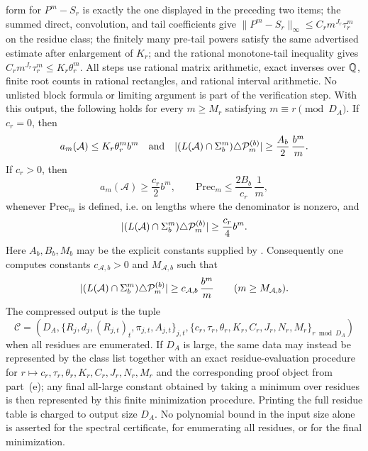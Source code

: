 \begin{theorem}
  form for \(P^m-S_r\) is exactly the one displayed in the preceding
  two items; the summed direct, convolution, and tail coefficients give
  \(\|P^m-S_r\|_\infty\le C_rm^{J_r}\tau_r^m\) on the residue class;
  the finitely many pre-tail powers satisfy the same advertised
  estimate after enlargement of \(K_r\); and the rational monotone-tail
  inequality gives \(C_rm^{J_r}\tau_r^m\le K_r\theta_r^m\). All steps
  use rational matrix arithmetic, exact inverses over \(\mathbb{Q}\), finite
  root counts in rational rectangles, and rational interval arithmetic.
  No unlisted block formula or limiting argument is part of the
  verification step.
  With this output, the following holds for every
  \(m\ge M_r\) satisfying \(m\equiv r\pmod {D_A}\).
  If \(c_r=0\), then
  \[
    a_m(\mathcal A)\le K_r\theta_r^m b^m
    \quad\text{and}\quad
    \lvert (L(\mathcal A)\cap\Sigma_b^m)\triangle\mathcal P_m^{(b)} \rvert
    \ge \frac{A_b}{2}\,\frac{b^m}{m}.
  \]
  If \(c_r>0\), then
  \[
    a_m(\mathcal A)\ge \frac{c_r}{2}b^m,
    \qquad
    \mathrm{Prec}_m\le \frac{2B_b}{c_r}\,\frac1m,
  \]
  whenever \(\mathrm{Prec}_m\) is defined, i.e. on lengths where the
  denominator is nonzero, and
  \[
    \lvert (L(\mathcal A)\cap\Sigma_b^m)\triangle\mathcal P_m^{(b)} \rvert
    \ge \frac{c_r}{4} b^m .
  \]
  Here \(A_b,B_b,M_b\) may be the explicit constants supplied by
  . Consequently
  one computes constants \(c_{\mathcal A,b}>0\) and \(M_{\mathcal A,b}\)
  such that
  \[
    \lvert (L(\mathcal A)\cap\Sigma_b^m)\triangle\mathcal P_m^{(b)} \rvert
    \ge c_{\mathcal A,b}\,\frac{b^m}{m}
    \qquad(m\ge M_{\mathcal A,b}).
  \]
  The compressed output is the tuple
  \[
    \mathcal C=(D_A,\{R_j,d_j,(R_{j,t})_t,\pi_{j,t},A_{j,t}\}_{j,t},
      \{c_r,\tau_r,\theta_r,K_r,C_r,J_r,N_r,M_r\}_{r\bmod D_A})
  \]
  when all residues are enumerated. If \(D_A\) is large, the same data
  may instead be represented by the class list together with an exact
  residue-evaluation procedure for
  \(r\mapsto c_r,\tau_r,\theta_r,K_r,C_r,J_r,N_r,M_r\) and the
  corresponding proof object from part~\textup{(e)};
  any final all-large constant obtained by taking a minimum over
  residues is then represented by this finite minimization procedure.
  Printing the full residue table is charged to output size \(D_A\).
  No polynomial bound in the input size alone is asserted for the
  spectral certificate, for enumerating all residues, or for the final
  minimization.
\end{theorem}

